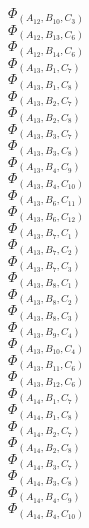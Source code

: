 \documentclass[14pt]{article}
\begin{document}
    $\Phi_{({A}_{12}, {B}_{10}, {C}_{3})}$ \\ 
    $\Phi_{({A}_{12}, {B}_{13}, {C}_{6})}$ \\ 
    $\Phi_{({A}_{12}, {B}_{14}, {C}_{6})}$ \\ 
    $\Phi_{({A}_{13}, {B}_{1}, {C}_{7})}$ \\ 
    $\Phi_{({A}_{13}, {B}_{1}, {C}_{8})}$ \\ 
    $\Phi_{({A}_{13}, {B}_{2}, {C}_{7})}$ \\ 
    $\Phi_{({A}_{13}, {B}_{2}, {C}_{8})}$ \\ 
    $\Phi_{({A}_{13}, {B}_{3}, {C}_{7})}$ \\ 
    $\Phi_{({A}_{13}, {B}_{3}, {C}_{8})}$ \\ 
    $\Phi_{({A}_{13}, {B}_{4}, {C}_{9})}$ \\ 
    $\Phi_{({A}_{13}, {B}_{4}, {C}_{10})}$ \\ 
    $\Phi_{({A}_{13}, {B}_{6}, {C}_{11})}$ \\ 
    $\Phi_{({A}_{13}, {B}_{6}, {C}_{12})}$ \\ 
    $\Phi_{({A}_{13}, {B}_{7}, {C}_{1})}$ \\ 
    $\Phi_{({A}_{13}, {B}_{7}, {C}_{2})}$ \\ 
    $\Phi_{({A}_{13}, {B}_{7}, {C}_{3})}$ \\ 
    $\Phi_{({A}_{13}, {B}_{8}, {C}_{1})}$ \\ 
    $\Phi_{({A}_{13}, {B}_{8}, {C}_{2})}$ \\ 
    $\Phi_{({A}_{13}, {B}_{8}, {C}_{3})}$ \\ 
    $\Phi_{({A}_{13}, {B}_{9}, {C}_{4})}$ \\ 
    $\Phi_{({A}_{13}, {B}_{10}, {C}_{4})}$ \\ 
    $\Phi_{({A}_{13}, {B}_{11}, {C}_{6})}$ \\ 
    $\Phi_{({A}_{13}, {B}_{12}, {C}_{6})}$ \\ 
    $\Phi_{({A}_{14}, {B}_{1}, {C}_{7})}$ \\ 
    $\Phi_{({A}_{14}, {B}_{1}, {C}_{8})}$ \\ 
    $\Phi_{({A}_{14}, {B}_{2}, {C}_{7})}$ \\ 
    $\Phi_{({A}_{14}, {B}_{2}, {C}_{8})}$ \\ 
    $\Phi_{({A}_{14}, {B}_{3}, {C}_{7})}$ \\ 
    $\Phi_{({A}_{14}, {B}_{3}, {C}_{8})}$ \\ 
    $\Phi_{({A}_{14}, {B}_{4}, {C}_{9})}$ \\ 
    $\Phi_{({A}_{14}, {B}_{4}, {C}_{10})}$ \\ 
\end{document}
